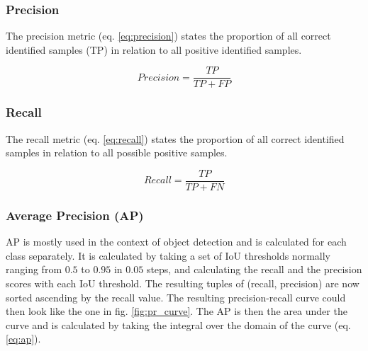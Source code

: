 \subsubsection{Precision}

The precision metric (eq. \ref{eq:precision}) states the proportion of all correct identified samples (\ac{TP}) in relation to all positive identified samples.

\begin{equation}
    Precision = \frac{TP}{TP + FP}
    \label{eq:precision}
\end{equation}

\subsubsection{Recall}

The recall metric (eq. \ref{eq:recall}) states the proportion of all correct identified samples in relation to all possible positive samples.

\begin{equation}
    Recall = \frac{TP}{TP + FN}
    \label{eq:recall}
\end{equation}





\subsubsection{Average Precision (AP)}

\ac{AP} is mostly used in the context of object detection and is calculated for each class separately.
It is calculated by taking a set of \ac{IoU} thresholds normally ranging from $0.5$ to $0.95$ in $0.05$ steps, and calculating the recall and the precision scores with each \ac{IoU} threshold.
The resulting tuples of (recall, precision) are now sorted ascending by the recall value.
The resulting precision-recall curve could then look like the one in fig. \ref{fig:pr_curve}.
The \ac{AP} is then the area under the curve and is calculated
by taking the integral over the domain of the curve (eq. \ref{eq:ap}).


